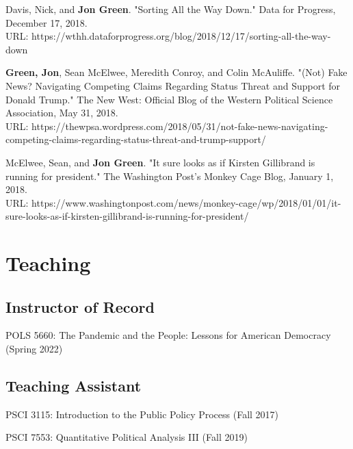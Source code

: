 \documentclass[letterpaper]{article}
\renewenvironment{itemize}{
  \begin{list}{}{
    \setlength{\leftmargin}{1.5em}
  }
}{
  \end{list}
}
\begin{document}
\begin{itemize}
\item Davis, Nick, and \textbf{Jon Green}. "Sorting All the Way Down." Data for Progress, December 17, 2018. \\
URL: https://wthh.dataforprogress.org/blog/2018/12/17/sorting-all-the-way-down

\item \textbf{Green, Jon}, Sean McElwee, Meredith Conroy, and Colin McAuliffe. "(Not) Fake News? Navigating Competing Claims Regarding Status Threat and Support for Donald Trump." The New West: Official Blog of the Western Political Science Association, May 31, 2018. \\
URL: https://thewpsa.wordpress.com/2018/05/31/not-fake-news-navigating-competing-claims-regarding-status-threat-and-trump-support/

\item McElwee, Sean, and \textbf{Jon Green}. "It sure looks as if Kirsten Gillibrand is running for president." The Washington Post's Monkey Cage Blog, January 1, 2018. \\ 
URL: https://www.washingtonpost.com/news/monkey-cage/wp/2018/01/01/it-sure-looks-as-if-kirsten-gillibrand-is-running-for-president/
\end{itemize}

\section*{Teaching}

\subsection*{Instructor of Record}

\begin{itemize}
\item POLS 5660: The Pandemic and the People: Lessons for American Democracy (Spring 2022)
\end{itemize}

\subsection*{Teaching Assistant}

\begin{itemize}
\item PSCI 3115: Introduction to the Public Policy Process (Fall 2017)
\item PSCI 7553: Quantitative Political Analysis III (Fall 2019) 
\end{itemize}
\end{document}
